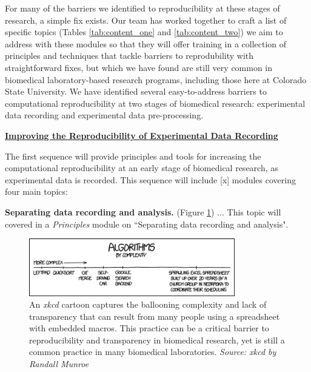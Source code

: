 \documentclass[pdftex,english,11pt,parskip=half]{scrartcl}
\begin{document}
For many of the barriers we identified to reproducibility at these stages of
research, a simple fix exists. Our team has worked together to craft a list of
specific topics (Tables \ref{tab:content_one} and \ref{tab:content_two}) we aim
to address with these modules so that they will offer training in a collection
of principles and techniques that tackle barriers to reprodubility with
straightforward fixes, but which we have found are still very common in
biomedical laboratory-based research programs, including those here at Colorado
State University. We have identified several easy-to-address barriers to
computational reproducibility at two stages of biomedical research: experimental
data recording and experimental data pre-processing.  

\underline{\textbf{Improving the Reproducibility of Experimental Data
Recording}} 

The first sequence will provide principles and tools for increasing the
computational reproducibility at an early stage of biomedical research, as
experimental data is recorded. This sequence will include [x] modules covering
four main topics: 

\textbf{Separating data recording and analysis.} (Figure \ref{fig:spreadsheet})
... This topic will covered in a \textit{Principles} module on ``Separating data
recording and analysis".

\begin{figure}[b] \centering \includegraphics[width =
0.8\textwidth]{figures/algorithms.png} \caption{An \textit{xkcd} cartoon
captures the ballooning complexity and lack of transparency that can result from
many people using a spreadsheet with embedded macros. This practice can be a
critical barrier to reproducibility and transparency in biomedical research, yet
is still a common practice in many biomedical laboratories. \textit{Source: xkcd
by Randall Munroe}} \label{fig:spreadsheet} \end{figure}
\end{document}
